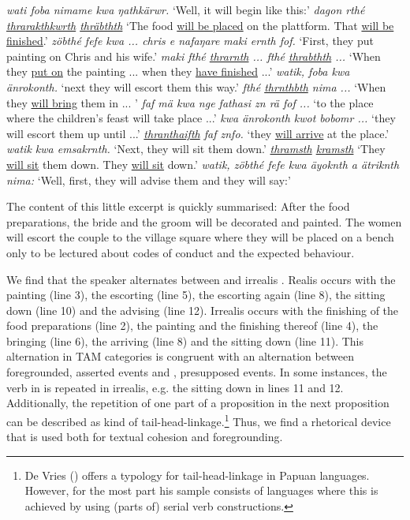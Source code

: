 \begin{exe}
\ex
\begin{xlist}
	 \emph{wati foba nimame kwa ŋathkärwr.}
	\trans `Well, it will begin like this:'
	 \emph{dagon rthé \underline{thrarakthkwrth} \underline{thräbthth}}
	\trans `The food \underline{will be placed} on the plattform. That \underline{will be finished}.'
	 \emph{zöbthé fefe kwa ... chris e nafaŋare maki ernth fof.}
	\trans `First, they put painting on Chris and his wife.'
	 \emph{maki fthé \underline{thrarnth} ... fthé \underline{thrabthth} ...}
	\trans `When they \underline{put on} the painting ... when they \underline{have finished} ...'
	 \emph{watik, foba kwa änrokonth.}
	\trans `next they will escort them this way.'
	 \emph{fthé \underline{thrnthbth} nima ...}
	\trans `When they \underline{will bring} them in ... '
	 \emph{faf mä kwa nge fathasi zn rä fof ...}
	\trans `to the place where the children's feast will take place ...'
	 \emph{kwa änrokonth kwot bobomr ...}
	\trans `they will escort them up until ...'
	 \emph{\underline{thranthaifth} faf znfo.}
	\trans `they \underline{will arrive} at the place.'
	 \emph{watik kwa emsakrnth.}
	\trans `Next, they will sit them down.'
	 \emph{\underline{thramsth} \underline{kramsth}}
	\trans `They \underline{will sit} them down. They \underline{will sit} down.'
	 \emph{watik, zöbthé fefe kwa äyoknth a ätriknth nima:}
	\trans `Well, first, they will advise them and they will say:'
\end{xlist}
\label{fathasitext}
\end{exe}

The content of this little excerpt is quickly summarised: After the food preparations, the bride and the groom will be decorated and painted. The women will escort the couple to the village square where they will be placed on a bench only to be lectured about codes of conduct and the expected behaviour.%

We find that the speaker alternates between  and irrealis . Realis occurs with the painting (line 3), the escorting (line 5), the escorting again (line 8), the sitting down (line 10) and the advising (line 12). Irrealis occurs with the finishing of the food preparations (line 2), the painting and the finishing thereof (line 4), the bringing (line 6), the arriving (line 8) and the sitting down (line 11). This alternation in TAM categories is congruent with an alternation between foregrounded, asserted events and , presupposed events. In some instances, the verb in  is repeated in irrealis, e.g. the sitting down in lines 11 and 12. Additionally, the repetition of one part of a proposition in the next proposition can be described as kind of tail-head-linkage.\footnote{De Vries (\citeyear{deVries:2005tm}) offers a typology for tail-head-linkage in Papuan languages. However, for the most part his sample consists of languages where this is achieved by using (parts of) serial verb constructions.} Thus, we find a rhetorical device that is used both for textual cohesion and foregrounding.%

